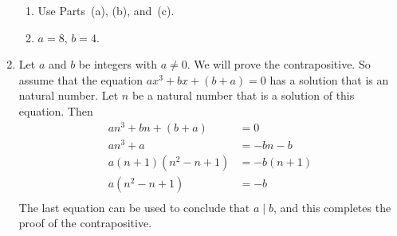 \begin{enumerate}
\begin{enumerate}
\item Use Parts~(a), (b), and~(c).

\item $a = 8$, $b = 4$.
\end{enumerate}

\item Let $a$ and $b$ be integers with $a \ne 0$.  We will prove the contrapositive.  So assume that the equation $ax^3 + bx + \left( b + a \right) = 0$ has a solution that is an natural number.  Let $n$ be a natural number that is a solution of this equation.  Then
\[
\begin{aligned}
an^3 + bn + \left( b + a \right) &= 0 \\
an^3 + a &= -bn - b \\
a \left(n + 1\right) \left(n^2 - n + 1 \right) &= -b \left( n + 1 \right) \\
a \left( n^2 - n + 1 \right) &= -b \\
\end{aligned}
\]
The last equation can be used to conclude that $a \mid b$, and this completes the proof of the contrapositive.
\end{enumerate}


